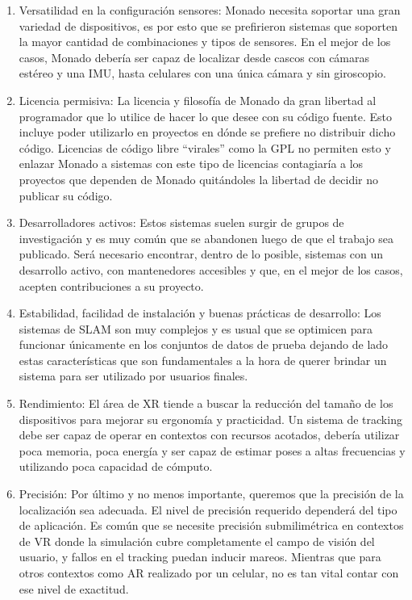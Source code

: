 \documentclass[ twoside,openright,titlepage,numbers=noenddot,%
                headinclude,footinclude,cleardoublepage=empty,abstract=on,
                BCOR=-5mm,paper=a4,fontsize=11pt
                ]{scrreprt}
\begin{document}
\begin{enumerate}
\def\labelenumi{\arabic{enumi}.}
\item
  Versatilidad en la configuración sensores: Monado necesita soportar
  una gran variedad de dispositivos, es por esto que se prefirieron
  sistemas que soporten la mayor cantidad de combinaciones y tipos de
  sensores. En el mejor de los casos, Monado debería ser capaz de
  localizar desde cascos con cámaras estéreo y una IMU, hasta celulares
  con una única cámara y sin giroscopio.
\item
  Licencia permisiva: La licencia y filosofía de Monado da gran libertad
  al programador que lo utilice de hacer lo que desee con su código
  fuente. Esto incluye poder utilizarlo en proyectos en dónde se
  prefiere no distribuir dicho código. Licencias de código libre
  ``virales'' como la GPL \autocite{GNUGeneralPublic} no permiten esto y
  enlazar Monado a sistemas con este tipo de licencias contagiaría a los
  proyectos que dependen de Monado quitándoles la libertad de decidir no
  publicar su código.
\item
  Desarrolladores activos: Estos sistemas suelen surgir de grupos de
  investigación y es muy común que se abandonen luego de que el trabajo
  sea publicado. Será necesario encontrar, dentro de lo posible,
  sistemas con un desarrollo activo, con mantenedores accesibles y que,
  en el mejor de los casos, acepten contribuciones a su proyecto.
\item
  Estabilidad, facilidad de instalación y buenas prácticas de
  desarrollo: Los sistemas de SLAM son muy complejos y es usual que se
  optimicen para funcionar únicamente en los conjuntos de datos de
  prueba dejando de lado estas características que son fundamentales a
  la hora de querer brindar un sistema para ser utilizado por usuarios
  finales.
\item
  Rendimiento: El área de XR tiende a buscar la reducción del tamaño de
  los dispositivos para mejorar su ergonomía y practicidad. Un sistema
  de tracking debe ser capaz de operar en contextos con recursos
  acotados, debería utilizar poca memoria, poca energía y ser capaz de
  estimar poses a altas frecuencias y utilizando poca capacidad de
  cómputo.
\item
  Precisión: Por último y no menos importante, queremos que la precisión
  de la localización sea adecuada. El nivel de precisión requerido
  dependerá del tipo de aplicación. Es común que se necesite precisión
  submilimétrica en contextos de VR donde la simulación cubre
  completamente el campo de visión del usuario, y fallos en el tracking
  puedan inducir mareos. Mientras que para otros contextos como AR
  realizado por un celular, no es tan vital contar con ese nivel de
  exactitud.
\end{enumerate}
\end{document}
